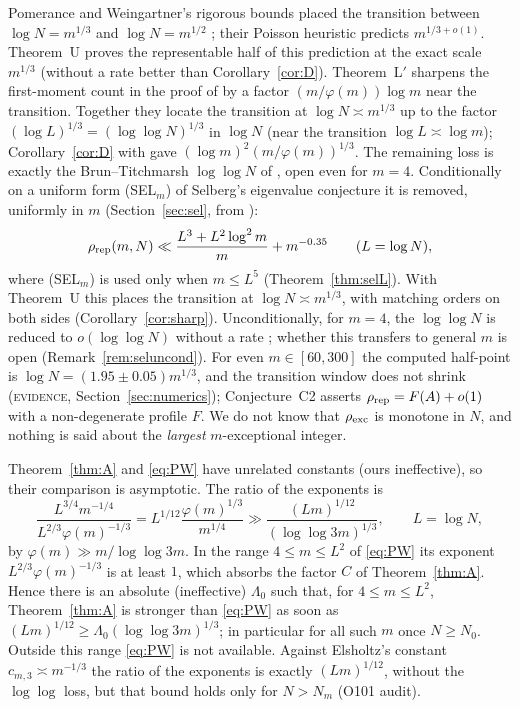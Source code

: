 \documentclass[10pt,reqno]{amsart}
\theoremstyle{definition}
\newcommand{\status}[1]{\textup{\textsc{#1}}}
\begin{document}
Pomerance and Weingartner's rigorous bounds placed the transition
between $\log N=m^{1/3}$ and $\log N=m^{1/2}$ \cite[p.~2]{PW}; their
Poisson heuristic \cite[p.~3]{PW} predicts $m^{1/3+o(1)}$.
Theorem~U proves the representable half of this prediction at the exact
scale $m^{1/3}$ (without a rate better than Corollary~\ref{cor:D}).
Theorem~L$'$ sharpens the first-moment count in the proof of
\cite[Thm.~3.1]{PW} by a factor $(m/\varphi(m))\log m$ near the transition.  Together
they locate the transition at $\log N\asymp m^{1/3}$ up to the factor
$(\log L)^{1/3}=(\log\log N)^{1/3}$ in $\log N$ (near the transition
$\log L\asymp\log m$);
Corollary~\ref{cor:D} with \cite{PW} gave $(\log m)^2(m/\varphi(m))^{1/3}$.
The remaining loss is exactly the Brun--Titchmarsh $\log\log N$ of
\cite[Thm.~1.1]{ET}, open even for $m=4$.  Conditionally on a uniform
form (SEL$_m$) of Selberg's eigenvalue conjecture it is removed,
uniformly in $m$ (Section~\ref{sec:sel}, from \cite{MN4}):
\[
 \rho_{\rm rep}(m,N)\ll\frac{L^3+L^2\log^2m}m+m^{-0.35}\qquad(L=\log N),
\]
where (SEL$_m$) is used only when $m\leq L^5$ (Theorem~\ref{thm:selL}).  With
Theorem~U this places the transition at $\log N\asymp m^{1/3}$, with
matching orders on both sides (Corollary~\ref{cor:sharp}).  Unconditionally,
for $m=4$, the $\log\log N$ is reduced to $o(\log\log N)$ without a rate
\cite[Thm.~1]{HN}; whether this transfers to general $m$ is open
(Remark~\ref{rem:seluncond}).
For even $m\in[60,300]$ the computed half-point is
$\log N=(1.95\pm0.05)m^{1/3}$, and the transition window does not shrink
(\status{evidence}, Section~\ref{sec:numerics}); Conjecture~C2 asserts
$\rho_{\rm rep}=F(A)+o(1)$ with a non-degenerate profile $F$.  We do not
know that $\rho_{\rm exc}$ is monotone in $N$, and nothing is said about
the \emph{largest} $m$-exceptional integer.

Theorem~\ref{thm:A} and \eqref{eq:PW} have unrelated constants (ours
ineffective), so their comparison is asymptotic.  The ratio of the
exponents is
\begin{equation}\label{eq:ratio}
 \frac{L^{3/4}m^{-1/4}}{L^{2/3}\varphi(m)^{-1/3}}
 =L^{1/12}\frac{\varphi(m)^{1/3}}{m^{1/4}}
 \gg\frac{(Lm)^{1/12}}{(\log\log3m)^{1/3}},\qquad L=\log N,
\end{equation}
by $\varphi(m)\gg m/\log\log3m$.  In the range $4\leq m\leq L^2$ of
\eqref{eq:PW} its exponent $L^{2/3}\varphi(m)^{-1/3}$ is at least $1$, which
absorbs the factor $C$ of Theorem~\ref{thm:A}.  Hence there is an absolute
(ineffective) $\Lambda_0$ such that, for $4\leq m\leq L^2$,
Theorem~\ref{thm:A} is stronger than \eqref{eq:PW} as soon as
$(Lm)^{1/12}\geq\Lambda_0(\log\log3m)^{1/3}$; in particular for all such
$m$ once $N\geq N_0$.  Outside this range \eqref{eq:PW} is not available.
Against Elsholtz's constant $c_{m,3}\asymp m^{-1/3}$ the ratio of the
exponents is exactly $(Lm)^{1/12}$, without the $\log\log$ loss, but that
bound holds only for $N>N_m$ (O101 audit).
\end{document}
